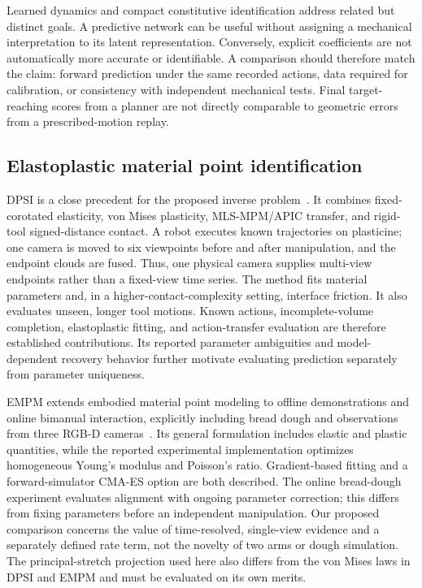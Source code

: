 Learned dynamics and compact constitutive identification address related but distinct goals. A predictive network can be useful without assigning a mechanical interpretation to its latent representation. Conversely, explicit coefficients are not automatically more accurate or identifiable. A comparison should therefore match the claim: forward prediction under the same recorded actions, data required for calibration, or consistency with independent mechanical tests. Final target-reaching scores from a planner are not directly comparable to geometric errors from a prescribed-motion replay.

\subsection{Elastoplastic material point identification}

DPSI is a close precedent for the proposed inverse problem~\cite{dpsi2025}. It combines fixed-corotated elasticity, von Mises plasticity, MLS-MPM/APIC transfer, and rigid-tool signed-distance contact. A robot executes known trajectories on plasticine; one camera is moved to six viewpoints before and after manipulation, and the endpoint clouds are fused. Thus, one physical camera supplies multi-view endpoints rather than a fixed-view time series. The method fits material parameters and, in a higher-contact-complexity setting, interface friction. It also evaluates unseen, longer tool motions. Known actions, incomplete-volume completion, elastoplastic fitting, and action-transfer evaluation are therefore established contributions. Its reported parameter ambiguities and model-dependent recovery behavior further motivate evaluating prediction separately from parameter uniqueness.

EMPM extends embodied material point modeling to offline demonstrations and online bimanual interaction, explicitly including bread dough and observations from three RGB-D cameras~\cite{empm2026}. Its general formulation includes elastic and plastic quantities, while the reported experimental implementation optimizes homogeneous Young's modulus and Poisson's ratio. Gradient-based fitting and a forward-simulator CMA-ES option are both described. The online bread-dough experiment evaluates alignment with ongoing parameter correction; this differs from fixing parameters before an independent manipulation. Our proposed comparison concerns the value of time-resolved, single-view evidence and a separately defined rate term, not the novelty of two arms or dough simulation. The principal-stretch projection used here also differs from the von Mises laws in DPSI and EMPM and must be evaluated on its own merits.

